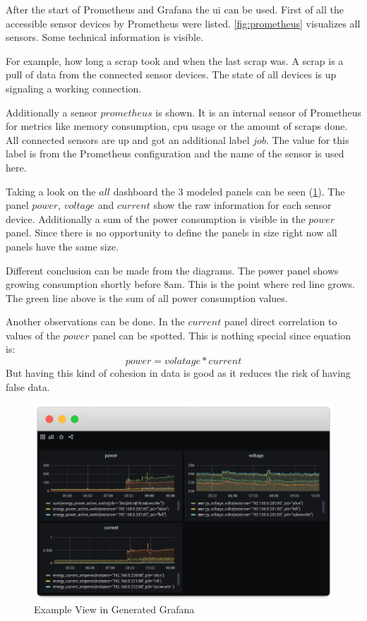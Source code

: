 After the start of Prometheus and Grafana the \gls{ui} can be used. First of all the accessible sensor devices by Prometheus were listed. \cref{fig:prometheus} visualizes all sensors. Some technical information is visible. 

For example, how long a scrap took and when the last scrap was. A scrap is a pull of data from the connected sensor devices. The state of all devices is up signaling a working connection. 

Additionally a sensor $prometheus$ is shown. It is an internal sensor of Prometheus for metrics like memory consumption, \gls{cpu} usage or the amount of scraps done. All connected sensors are up and got an additional label $job$. The value for this label is from the Prometheus configuration and the name of the sensor is used here.


Taking a look on the $all$ dashboard the 3 modeled panels can be seen (\cref{fig:grafana}). The panel $power$, $voltage$ and $current$ show the raw information for each sensor device. Additionally a sum of the power consumption is visible in the $power$ panel. Since there is no opportunity to define the panels in size right now all panels have the same size. 

Different conclusion can be made from the diagrams. The power panel shows growing consumption shortly before 8am. This is the point where red line grows. The green line above is the sum of all power consumption values. 

Another observations can be done. In the $current$ panel direct correlation to values of the $power$ panel can be spotted. This is nothing special since equation is:
\begin{equation*}
power = volatage * current
\end{equation*}
But having this kind of cohesion in data is good as it reduces the risk of having false data. 


\begin{figure}[!ht]
	\includegraphics[width=\linewidth]{assets/images/dashboard_all}
	\caption{Example View in Generated Grafana}
	\label{fig:grafana}
\end{figure}